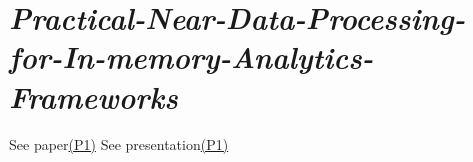 \documentclass{article}
\newcommand{\paper}[2]{\hyperlink{./papers/#1.pdf.#2}{(P#2)}}
\begin{document}
\section{\textit{Practical-Near-Data-Processing-for-In-memory-Analytics-Frameworks}}
See paper\paper{Practical-Near-Data-Processing-for-In-memory-Analytics-Frameworks}{1}
See presentation\paper{Practical-Near-Data-Processing-for-In-memory-Analytics-Frameworks(Presentation)}{1}








%
%
\end{document}
